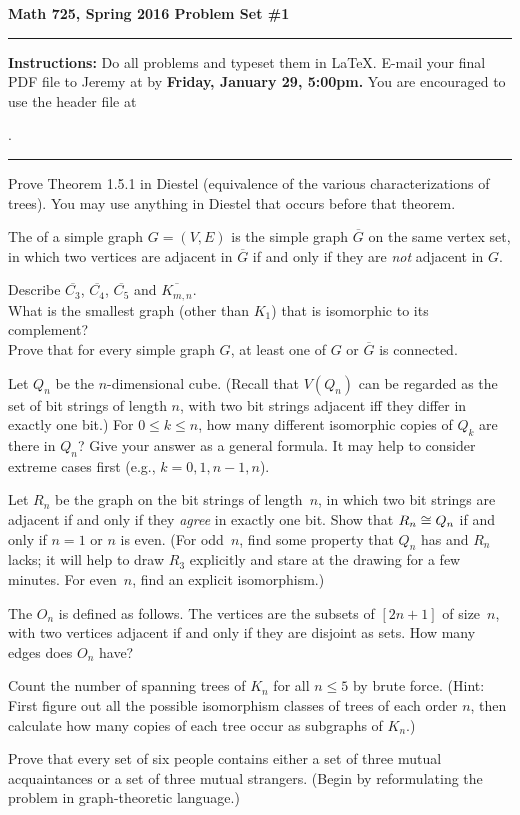 

\thispagestyle{empty} %
{\bf Math 725, Spring 2016 \hfill Problem Set \#1}
\smallskip\hrule

{\bf Instructions:} Do all problems and typeset them in \LaTeX.  E-mail your final PDF file to Jeremy at  by {\bf Friday, January 29, 5:00pm.}
You are encouraged to use the header file at
\begin{center}.\end{center}
\smallskip\hrule

\prob Prove Theorem 1.5.1 in Diestel (equivalence of the various characterizations of trees).  You may use anything in Diestel that occurs before that theorem.

\prob The  of a simple graph $G=(V,E)$ is the simple graph $\overline{G}$ on the same vertex set, in which two vertices are adjacent in $\overline{G}$ if and only if they are \emph{not} adjacent in $G$.

\probpart Describe $\overline{C_3}$, $\overline{C_4}$, $\overline{C_5}$ and $\overline{K_{m,n}}$.\\
\probpart What is the smallest graph (other than $K_1$) that is isomorphic to its complement?\\
\probpart Prove that for every simple graph $G$, at least one of $G$ or $\overline{G}$ is connected.

\prob Let $Q_n$ be the $n$-dimensional cube.  (Recall that $V(Q_n)$ can be regarded as the set of bit strings of length $n$, with two bit strings adjacent iff they differ in exactly one bit.)  For $0\leq k\leq n$, how many different isomorphic copies of $Q_k$ are there in $Q_n$?  Give your answer as a general formula.  It may help to consider extreme cases first (e.g., $k=0,1,n-1,n$).

\prob Let $R_n$ be the graph on the bit strings of length~$n$, in which two bit strings are adjacent if and only if they \emph{agree} in exactly one bit.  Show that $R_n\cong Q_n$ if and only if $n=1$ or $n$ is even.  (For odd~$n$, find some property that $Q_n$ has and $R_n$ lacks; it will help to draw $R_3$ explicitly and stare at the drawing for a few minutes.  For even~$n$, find an explicit isomorphism.)

\prob The  $O_n$ is defined as follows. The vertices are the subsets of $[2n+1]$ of size~$n$, with two vertices adjacent if and only if they are disjoint as sets.  How many edges does $O_n$ have?

\prob Count the number of spanning trees of $K_n$ for all $n\leq 5$ by brute force.  (Hint: First figure out all the possible isomorphism classes of trees of each order $n$, then calculate how many copies of each tree occur as subgraphs of $K_n$.)

\prob Prove that every set of six people contains either a set of three mutual acquaintances or a set of three mutual strangers.  (Begin by reformulating the problem in graph-theoretic language.)


